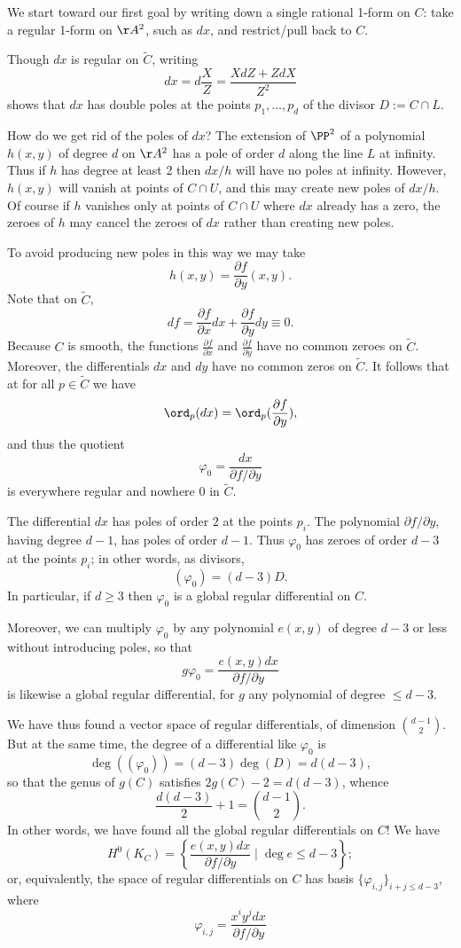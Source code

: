 We start toward our first goal by writing down a single rational 1-form on $C$: 
 take a regular 1-form on $\AA^2$, such as $dx$, and restrict/pull back to $C$. 

Though $dx$ is regular on $\widetilde C$, writing
$$
dx = d\frac{X}{Z} = \frac{X dZ+ Z dX}{Z^2}
$$
 shows that $dx$ has double poles at the points $p_1,\dots,p_d$ of the divisor $D := C \cap L$.
 
How do we get rid of the poles of $dx$? The extension of $\PP^2$ of a polynomial $h(x,y)$ of degree $d$ on
$\AA^2$ has a pole of order $d$ along the line $L$ at infinity. Thus if $h$ has degree at least 2 then $dx/h$ will have no poles at infinity. However, $h(x,y)$ will vanish at points of $C \cap U$, and this may create new poles of $dx/h$. Of course if $h$ vanishes only at  points of $C \cap U$ where $dx$ already has a zero, the zeroes of $h$ may cancel the zeroes of $dx$ rather than creating new poles.
 
 To avoid producing new poles in this way we may take
 $$
 h(x,y) = \frac{\partial f}{\partial y}(x,y).
 $$
 Note that on $\widetilde C$,
 $$
 df = \frac{\partial f}{\partial x}dx + \frac{\partial f}{\partial y}dy \equiv 0.
 $$
Because $C$ is smooth, the functions $\frac{\partial f}{\partial x}$ and $\frac{\partial f}{\partial y}$ have no common zeroes on $\widetilde C$. Moreover, the differentials $dx$ and $dy$ have no common zeros on $\widetilde C$. It follows that at for all $p \in \widetilde C$ we  have
$$
\ord_p(dx) = \ord_p(\frac{\partial f}{\partial y}), 
$$ 
and thus the quotient 
$$
\varphi_0 = \frac{dx}{\partial f/\partial y}
$$
is everywhere regular and nowhere 0 in $\widetilde C$.

The differential $dx$ has poles of order $2$ at the points $p_i$. The polynomial $\partial f/\partial y$, having degree $d-1$, has poles of order $d-1$. Thus $\varphi_0$ has zeroes of order $d-3$ at the points $p_i$; in other words, as divisors,
$$
(\varphi_0) = (d-3)D.
$$
In particular, if $d \geq 3$ then $\varphi_0$ is a global regular differential on $C$.

Moreover, we can  multiply $\varphi_0$ by any polynomial $e(x,y)$ 
  of degree $d-3$ or less without introducing poles, so that 
$$
g\varphi_0 = \frac{e(x,y)dx}{\partial f/\partial y}
$$ 
is likewise a global regular differential, for $g$  any polynomial of degree $\leq d-3$.

We have thus found a vector space of regular differentials, of dimension $\binom{d-1}{2}$. But at the same time, the degree of a differential like $\varphi_0$ is
$$
\deg((\varphi_0)) = (d-3)\deg(D) = d(d-3),
$$
so that the genus of $g(C)$ satisfies
$2g(C)-2 = d(d-3)$, whence
$$
\frac{d(d-3)}{2} + 1 = \binom{d-1}{2}.
$$
In other words, we have found all the global regular differentials on $C$! We have
$$
H^0(K_C) = \left\{ \frac{e(x,y)dx}{\partial f/\partial y} \mid \deg e \leq d-3\right\};
$$
or, equivalently, the space of regular differentials on $C$ has basis $\{\varphi_{i,j} \}_{i+j \leq d-3}$, where
$$
\varphi_{i,j} =  \frac{x^iy^jdx}{\partial f/\partial y}
$$

